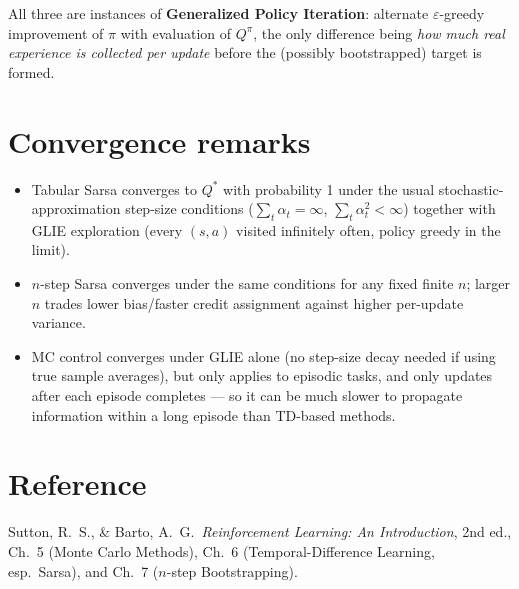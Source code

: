 \documentclass[11pt]{article}
\begin{document}
All three are instances of \textbf{Generalized Policy Iteration}: alternate
$\varepsilon$-greedy improvement of $\pi$ with evaluation of $Q^\pi$, the
only difference being \emph{how much real experience is collected per
update} before the (possibly bootstrapped) target is formed.

\section{Convergence remarks}

\begin{itemize}
    \item Tabular Sarsa converges to $Q^*$ with probability 1 under the
        usual stochastic-approximation step-size conditions
        ($\sum_t \alpha_t = \infty$, $\sum_t \alpha_t^2 < \infty$) together
        with GLIE exploration (every $(s,a)$ visited infinitely often,
        policy greedy in the limit).
    \item $n$-step Sarsa converges under the same conditions for any fixed
        finite $n$; larger $n$ trades lower bias/faster credit assignment
        against higher per-update variance.
    \item MC control converges under GLIE alone (no step-size decay needed
        if using true sample averages), but only applies to episodic
        tasks, and only updates after each episode completes — so it can
        be much slower to propagate information within a long episode than
        TD-based methods.
\end{itemize}

\section{Reference}

Sutton, R.\ S., \& Barto, A.\ G.\ \emph{Reinforcement Learning: An
Introduction}, 2nd ed., Ch.~5 (Monte Carlo Methods), Ch.~6 (Temporal-Difference
Learning, esp.\ Sarsa), and Ch.~7 ($n$-step Bootstrapping).
\end{document}
